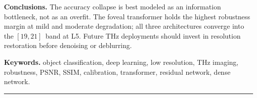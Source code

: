 \noindent\textbf{Conclusions.}\quad
The accuracy collapse is best modeled as an information bottleneck, not
as an overfit. The foveal transformer holds the highest robustness
margin at mild and moderate degradation; all three architectures
converge into the $[19, 21]\,$\Mpp{} band at L5. Future THz deployments
should invest in resolution restoration before denoising or deblurring.

\noindent\textbf{Keywords.}\quad
object classification, deep learning, low resolution, THz imaging,
robustness, PSNR, SSIM, calibration, transformer, residual network,
dense network.

\bigskip
\hrule
\bigskip

%
\ifdefined\XeTeXversion
  \begin{hebrew}
  
  \end{hebrew}
\else
  
\fi

